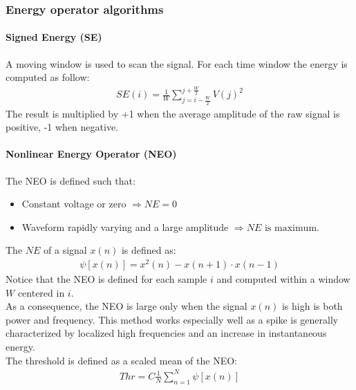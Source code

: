 \subsubsection{Energy operator algorithms}
\paragraph{Signed Energy (SE)}
A moving window is used to scan the signal. For each time window the energy is
computed as follow:
\begin{align*}
    SE(i)=\frac{1}{W}\sum_{j=i-\frac{W}{2}}^{j+\frac{W}{2}}V(j)^2
\end{align*}
The result is multiplied by +1 when the average amplitude of the raw signal is
positive, -1 when negative.
\paragraph{Nonlinear Energy Operator (NEO)}
The NEO is defined such that:
\begin{itemize}
    \item Constant voltage or zero \(\Rightarrow NE=0\)
    \item Waveform rapidly varying and a large amplitude
    \(\Rightarrow NE \text{ is maximum}\).
\end{itemize}
The \(NE\) of a signal \(x(n)\) is defined as:
\begin{align*}
    \psi[x(n)]=x^2(n)-x(n+1)\cdot x(n-1)
\end{align*}
Notice that the NEO is defined for each sample \(i\) and computed within a
window \(W\) centered in \(i\).\\
As a consequence, the NEO is large only when the signal \(x(n)\) is high is both
power and frequency. This method works especially well as a spike is generally
characterized by localized high frequencies and an increase in instantaneous
energy.\\
The threshold is defined as a scaled mean of the NEO:
\begin{align*}
    Thr=C\frac{1}{N}\sum_{n=1}^{N}\psi[x(n)]
\end{align*}
